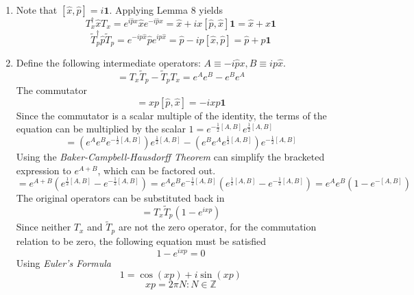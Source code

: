 \begin{sol}
\begin{enumerate}[label=\textbf{(\alph*)}]
\item
Note that $[\hat x,\hat p]=i\mathbf{1}$. Applying Lemma 8 yields
\begin{equation}
	T_x^\dagger\hat xT_x=e^{i\hat p x}\hat xe^{-i\hat px}=\hat x+ix[\hat p,\hat x]\mathbf{1}=\hat x+x\mathbf{1}
\end{equation}
\begin{equation}
	\tilde T_p^\dagger\hat p\tilde T_p=e^{-ip\hat x}\hat pe^{ip\hat x}=\hat p-ip[\hat x,\hat p]=\hat p+p\mathbf{1}
\end{equation}
\item
Define the following intermediate operators: $A\equiv-i\hat p x, B\equiv ip\hat x$.
\begin{equation}
	[T_x,\tilde T_p]=T_x\tilde T_p-\tilde T_pT_x=e^{A}e^{B}-e^{B}e^{A}
\end{equation}
The commutator 
\begin{equation}
	[A,B]=xp[\hat p,\hat x]=-ixp\mathbf{1}
\end{equation} 
Since the commutator is a scalar multiple of the identity, the terms of the equation can be multiplied by the scalar $1=e^{-\frac{1}{2}[A,B]}e^{\frac{1}{2}[A,B]}$ 
\begin{equation}
	[T_x, \tilde T_p]=(e^Ae^Be^{-\frac{1}{2}[A,B]})e^{\frac{1}{2}[A,B]}-(e^Be^Ae^{\frac{1}{2}[A,B]})e^{-\frac{1}{2}[A,B]}
\end{equation}
Using the \textit{Baker-Campbell-Hausdorff Theorem} can simplify the bracketed expression to $e^{A+B}$, which can be factored out.
\begin{equation}
	[T_x, \tilde T_p]=e^{A+B}(e^{\frac{1}{2}[A,B]}-e^{-\frac{1}{2}[A,B]})=e^Ae^Be^{-\frac{1}{2}[A,B]}(e^{\frac{1}{2}[A,B]}-e^{-\frac{1}{2}[A,B]})=e^Ae^B(1-e^{-[A,B]})
\end{equation} The original operators can be substituted back in
\begin{equation}
	[T_x, \tilde T_p]=T_x\tilde T_p(1-e^{ixp})
\end{equation} 
Since neither $T_x$ and $\tilde T_p$ are not the zero operator, for the commutation relation to be zero, the following equation must be satisfied
\begin{equation}
	1-e^{ixp}=0
\end{equation}
Using \textit{Euler's Formula}
\begin{equation}
	1=\cos(xp)+i\sin(xp)
\end{equation} 
\begin{equation}
	xp=2\pi N: N\in\mathbb Z
\end{equation} 
\end{enumerate}
\end{sol}
